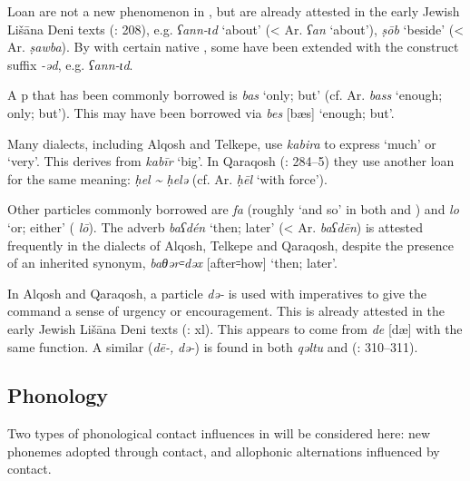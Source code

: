 \documentclass[output=paper]{langsci/langscibook}
\begin{document}
Loan  are not a new phenomenon in , but are already attested in the early Jewish Lišāna Deni texts (\citealt{Sabar1984}: 208), e.g. \textit{ʕann\nobreakdash-ɩd} ‘about’ (< Ar. \textit{ʕan} ‘about’), \textit{ṣōb} ‘beside’ (< Ar. \textit{ṣawba}). By  with certain native , some have been extended with the construct suffix \textit{\nobreakdash-əd}, e.g. \textit{ʕann\nobreakdash-ɩd}.

A p that has been commonly borrowed is \textit{bas} ‘only; but’ (cf.  Ar. \textit{bass} ‘enough; only; but’). This may have been borrowed via   \textit{bes} [bæs] ‘enough; but’.

Many dialects, including  Alqosh and  Telkepe, use \textit{kabira} to express ‘much’ or ‘very’. This derives from  \textit{kabīr} ‘big’. In  Qaraqosh (\citealt{Khan2002}: 284–5) they use another  loan for the same meaning: \textit{ḥel {\textasciitilde} ḥelə} (cf.  Ar. \textit{ḥēl} ‘with force’).

Other particles commonly borrowed are \textit{fa} (roughly ‘and so’ in both  and ) and \textit{lo} ‘or; either’ (  \textit{lō}). The adverb \textit{baʕdén} ‘then; later’ (< Ar. \textit{baʕdēn}) is attested frequently in the  dialects of Alqosh, Telkepe and Qaraqosh, despite the presence of an inherited synonym, \textit{baθər꞊dəx} [after꞊how] ‘then; later’.

In  Alqosh and  Qaraqosh, a particle \textit{də\nobreakdash-} is used with imperatives to give the command a sense of urgency or encouragement. This is already attested in the early Jewish Lišāna Deni texts (\citealt{Sabar1976}: xl). This appears to come from   \textit{de} [dæ] with the same function. A similar  (\textit{dē\nobreakdash-,} \textit{də\nobreakdash-}) is found in both \textit{qəltu} and   (\citealt{Jastrow1978}: 310–311).

\subsection{Phonology}

Two types of phonological contact influences in  will be considered here: new phonemes adopted through contact, and allophonic alternations influenced by contact.
\end{document}
